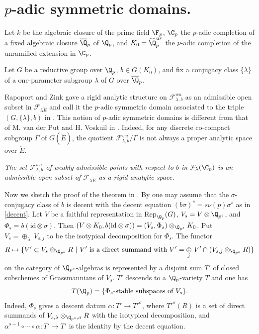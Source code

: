 \section{$p$-adic symmetric domains.}

Let $k$ be the algebraic closure of the prime field $\F_p$,
$\C_p$ the $p$-adic completion of a fixed algebraic closure
$\overline\Q_p$ of $\Q_p$, and
$K_0 = \widehat\Q_p^{ur}$ the $p$-adic completion
of the unramified extension in $\C_p$.

\begin{apppara}
 Let $G$ be a reductive group over $\Q_p$, $b \in
 G(K_0)$,
 and fix a conjugacy class $\{ \lambda \}$ of a one-parameter subgroup $\lambda$
 of $G$ over $\overline\Q_p$.

 Rapoport and Zink gave a rigid analytic structure
 on ${\mathcal F}_{\lambda, b}^{wa}$ as an admissible open subset
 in ${\mathcal F}_{\lambda \breve{E}}$ and call it the $p$-adic
 symmetric domain 
 associated to the triple $(G, \{ \lambda \}, b)$ in \cite{psfpg}.
 This notion of $p$-adic
 symmetric domains is different from that of M. van der Put
 and H. Voskuil in \cite{ssatsagoalf}. Indeed, for any discrete co-compact subgroup
 $\Gamma$ of $G(\breve{E})$,
 the quotient ${\mathcal F}_{\lambda, b}^{wa}/\Gamma$
 is not always a proper analytic space over $\breve{E}$.
\end{apppara}

\begin{appthm}
 \cite{psfpg} {\it The set ${\mathcal F}_{\lambda,
 b}^{wa}$
 of weakly admissible points with respect to $b$ in ${\mathcal
 F}_\lambda(\C_p)$
 is an admissible open subset of ${\mathcal F}_{\lambda \breve{E}}$ as a
 rigid analytic
 space.}
\end{appthm}

Now we sketch the proof of the theorem in \cite{psfpg}.
By \cite{iwas} one may assume that the $\sigma$-conjugacy class of $b$
is decent with the decent equation $(b\sigma)^s = s\nu(p)\sigma^s$ as in
\ref{decent}.
Let $V$ be a faithful representation in
$\mathrm{Rep}_{\Q_p}(G)$, 
$V_s = V \otimes \Q_{p^s}$, and $\Phi_s = b(\mathrm{id} \otimes
\sigma)$.
Then $(V \otimes K_0, b(\mathrm{id} \otimes \sigma))
= (V_s, \Phi_s) \otimes_{\Q_{p^s}} K_0$.
Put $V_s = \displaystyle{\mathop{\oplus}_\lambda}\ V_{s, j}$
to be the isotypical decomposition for $\Phi_s$. The functor
$$
    R \mapsto \{ V' \subset V_s \otimes_{\Q_{p^s}}
R ~|~
                 V'~ \text{is a direct summand with}~
                 V' = \displaystyle{\mathop{\oplus}_j}\
                       V' \cap (V_{s, j}
                       \otimes_{\Q_{p^s}} R) \}
$$
on the category of $\Q_{p^s}$-algebras is represented
by a disjoint sum $T'$ of closed
subschemes of Grassmannians of $V_s$. $T'$ descends to a
$\Q_p$-variety
$T$ and one has
$$
     T(\Q_p) = \{ \Phi_s\text{-stable subspaces of}~ V_s \}.
$$
Indeed, $\Phi_s$ gives a descent datum $\alpha : T' \rightarrow {T'}^\sigma$,
where ${T'}^\sigma(R)$ is a set of direct summands of
$V_{s, \lambda} \otimes_{\Q_{p^s}, \sigma} R$ with
the isotypical decomposition,
and $\alpha^{s-1} \circ \cdots \circ \alpha : T' \rightarrow T'$
is the identity by the decent equation.

